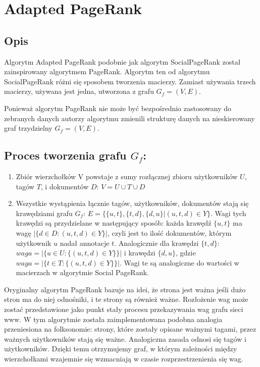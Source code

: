 \section{Adapted PageRank}
\subsection{Opis}

Algorytm Adapted PageRank podobnie jak algorytm SocialPageRank został zainspirowany algorytmem PageRank. Algorytm ten od algorytmu SocialPageRank różni się sposobem tworzenia macierzy. Zamiast używania trzech macierzy, używana jest jedna, utworzona z grafu $G_f = (V,E)$.


Ponieważ algorytm PageRank nie może być bezpośrednio zastosowany do zebranych danych autorzy algorytmu zmienili strukturę danych na nieskierowany graf trzydzielny $ G_f = (V,E)$.


\subsection*{Proces tworzenia grafu $G_f$:}

\begin{enumerate}
\item Zbiór wierzchołków V powstaje z sumy rozłącznej zbioru użytkowników $U$, tagów $T$, i dokumentów $D$: $V = U \cup T \cup D$

\item Wszystkie wystąpienia łącznie tagów, użytkowników, dokumentów  stają się krawędziami grafu $G_f$: $E = \{\{u,t\}, \{t,d\} ,\{d,u\} | (u,t,d) \in Y \}$. Wagi tych krawędzi są przydzielane w następujący sposób: każda krawędź $\{u,t\}$ ma wagę $| \{d \in D : (u,t,d) \in Y\}|$, czyli jest to ilość dokumentów, którym użytkownik $u$ nadał annotacje $t$. Analogicznie dla krawędzi $\{t,d\}$: $waga=|\{u \in U : \{(u,t,d) \in Y\}\}|$ i krawędzi $\{d, u\}$, gdzie $waga=| \{t \in T : \{(u,t,d) \in Y \} \} |$. Wagi te są analogiczne do wartości w macierzach w algorytmie Social PageRank.
\end{enumerate}

Oryginalny algorytm PageRank bazuje na idei, że strona jest ważna jeśli dużo stron ma do niej odnośniki, i te strony są również ważne. Rozłożenie wag może zostać przedstawione jako punkt stały procesu przekazywania wag grafu sieci www. W tym algorytmie została zaimplementowana podobna analogia przeniesiona na folksonomie: strony, które zostały opisane ważnymi tagami, przez ważnych użytkowników stają się ważne. Analogiczna zasada odnosi się tagów i użytkowników. Dzięki temu otrzymujemy graf, w którym zależności między wierzchołkami wzajemnie się wzmacniają w czasie rozprzestrzenienia się wag.

